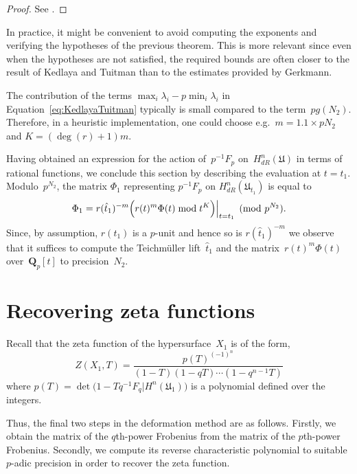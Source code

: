 \begin{proof}
See \citep[Theorem~2.1]{KedlayaTuitman2012}.
\end{proof}

\begin{rem} \label{rem:KedlayaTuitman}
In practice, it might be convenient to avoid computing the exponents and 
verifying the hypotheses of the previous theorem.  This is more relevant 
since even when the hypotheses are not satisfied, the required bounds are 
often closer to the result of Kedlaya and Tuitman than to the estimates 
provided by Gerkmann.

The contribution of the terms $\max_i \lambda_i - p \min_i \lambda_i$ 
in Equation~\eqref{eq:KedlayaTuitman} typically is small compared to the 
term~$p g(N_2)$. Therefore, in a heuristic implementation, one 
could choose e.g.\ $m = 1.1 \times p N_2$ and $K = (\deg(r) + 1) m$.
\end{rem}

Having obtained an expression for the action of~$p^{-1} F_p$ 
on~$H_{dR}^{n}(\mathfrak{U})$ in terms of rational functions, we conclude 
this section by describing the evaluation at $t = t_1$.  Modulo~$p^{N_2}$, 
the matrix $\Phi_1$ representing $p^{-1} F_p$ on 
$H_{dR}^{n}(\mathfrak{U}_{t_1})$ is equal to 
\begin{equation}
\Phi_1 = 
    r(\hat{t}_1)^{-m} 
    \Bigl( r(t)^m \Phi(t) \bmod{t^K} \Bigr) \Big\vert_{t=t_1} \pmod{p^{N_2}}.
\end{equation}
Since, by assumption, $r(t_1)$ is a $p$-unit and hence so is 
$r(\hat{t}_1)^{-m}$ we observe that it suffices to compute the 
Teichm\"uller lift~$\hat{t}_1$ and the matrix~$r(t)^m \Phi(t)$ 
over~$\mathbf{Q}_p[t]$ to precision~$N_2$.

\section{Recovering zeta functions}

Recall that the zeta function of the hypersurface~$X_1$ is of the form,
\begin{equation*}
Z(X_1,T) = \frac{p(T)^{(-1)^n}}{(1 - T) (1 - qT) \dotsm (1 - q^{n-1}T)}
\end{equation*}
where $p(T) = \det \bigl( 1 - T q^{-1} F_q | H^n(\mathfrak{U}_1) \bigr)$ 
is a polynomial defined over the integers.

Thus, the final two steps in the deformation method are as follows.  
Firstly, we obtain the matrix of the $q$th-power Frobenius from the matrix of 
the $p$th-power Frobenius.  Secondly, we compute its reverse characteristic 
polynomial to suitable $p$-adic precision in order to recover the zeta 
function.

